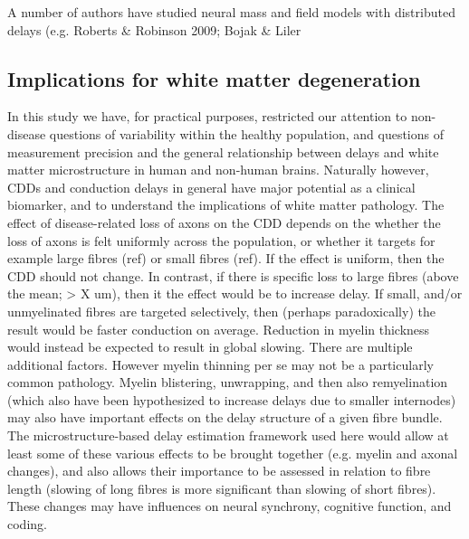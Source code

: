 A number of authors have studied neural mass and field models with distributed delays (e.g. Roberts \& Robinson 2009; Bojak & Liler




% 


\subsection{Implications for white matter degeneration}

In this study we have, for practical purposes, restricted our attention to non-disease questions of variability within the healthy population, and questions of measurement precision and the general relationship between delays and white matter microstructure in human and non-human brains. Naturally however, CDDs and conduction delays in general have major potential as a clinical biomarker, and to understand the implications of white matter pathology. The effect of disease-related loss of axons on the CDD depends on the whether the loss of axons is felt uniformly across the population, or whether it targets for example large fibres (ref) or small fibres (ref). If the effect is uniform, then the CDD should not change. In contrast, if there is specific loss to large fibres (above the mean; > X um), then it the effect would be to increase delay. If small, and/or unmyelinated fibres are targeted selectively, then (perhaps paradoxically) the result would be faster conduction on average. Reduction in myelin thickness would instead be expected to result in global slowing. There are multiple additional factors. However myelin thinning per se may not be a particularly common pathology. Myelin blistering, unwrapping, and then also remyelination (which also have been hypothesized to increase delays due to smaller internodes) may also have important effects on the delay structure of a given fibre bundle. The microstructure-based delay estimation framework used here would allow at least some of these various effects to be brought together (e.g. myelin and axonal changes), and also allows their importance to be assessed in relation to fibre length (slowing of long fibres is more significant than slowing of short fibres).  These changes may have influences on  neural synchrony, cognitive function, and coding.



